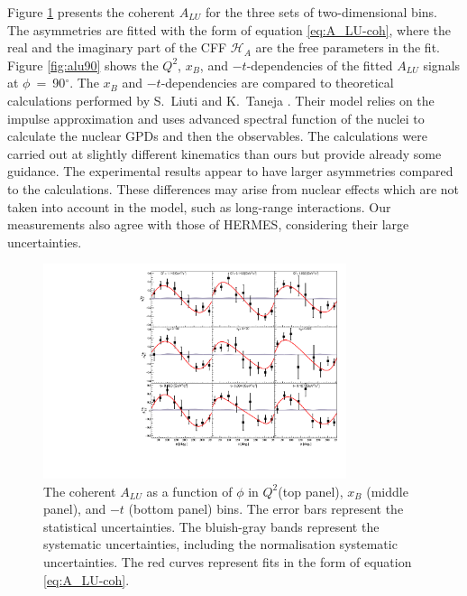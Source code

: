 \documentclass[nofootinbib,twocolumn,showpacs,prl,superscriptaddress,secnumarabic,amssymb,nobibnotes,aps,floatfix]{revtex4}
\begin{document}
Figure \ref{fig:alu} presents the coherent $A_{LU}$ for the three
sets of two-dimensional bins. The asymmetries are fitted with the form of
equation \ref{eq:A_LU-coh}, where the real and the imaginary part of the CFF
$\mathcal{H}_{A}$ are the free parameters in the fit. Figure \ref{fig:alu90} 
shows the $Q^2$, $x_{B}$, and $-t$-dependencies of the fitted $A_{LU}$ signals 
at $\phi$~=~90$^{\circ}$. The $x_{B}$ and $-t$-dependencies are compared to 
theoretical calculations performed by S.~Liuti and K.~Taneja 
\cite{simonetta_2}. Their model relies on the impulse approximation and uses 
advanced spectral function of the nuclei to calculate the nuclear GPDs and then 
the observables. The calculations were carried out at slightly different 
kinematics than ours but provide already some guidance. The experimental 
results appear to have larger asymmetries compared to the calculations.  These 
differences may arise from nuclear effects which are not taken into account in 
the model, such as long-range interactions. Our measurements also agree with 
those of HERMES, considering their large uncertainties.


\begin{figure}[tb]
\includegraphics[width=8.9cm]{figs/coherent-ALU.pdf}
\caption{The coherent $A_{LU}$ as a function of $\phi$ in
   $Q^{2}$(top panel), $x_{B}$ (middle panel), and $-t$ (bottom panel) bins.  
   The error bars represent the statistical uncertainties. The bluish-gray 
   bands represent the systematic uncertainties, including the normalisation 
systematic uncertainties. The red curves represent fits in the form of equation 
\ref{eq:A_LU-coh}.}
\label{fig:alu}
\end{figure}
\end{document}
